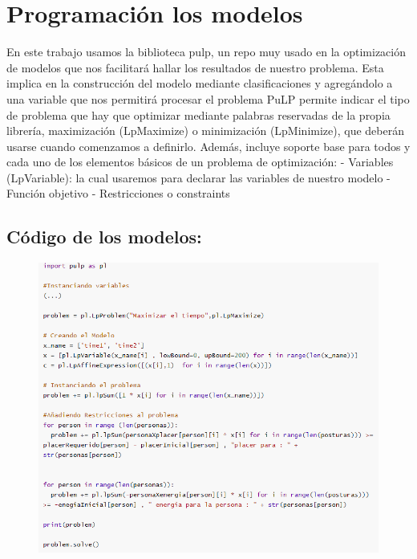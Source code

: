 \documentclass{llncs}
\begin{document}
\newpage

\section{Programación los modelos}	
En este trabajo usamos la biblioteca pulp, un repo muy usado en la optimización de modelos que nos facilitará hallar los resultados de nuestro problema. Esta implica en la construcción del modelo mediante clasificaciones y agregándolo a una variable que nos permitirá procesar el problema
\newline
\newline
PuLP permite indicar el tipo de problema que hay que optimizar mediante palabras reservadas de la propia librería, maximización (LpMaximize) o minimización (LpMinimize), que deberán usarse cuando comenzamos a definirlo. Además, incluye soporte base para todos y cada uno de los elementos básicos de un problema de optimización:
\newline
\newline
- Variables (LpVariable): la cual usaremos para declarar las variables de nuestro modelo
\newline
- Función objetivo
\newline
- Restricciones o constraints
\newpage
\subsection{Código de los modelos:}

\begin{figure}
	\centering
	\includegraphics[width=0.7\linewidth]{Imagenes/modelo1-Guia}
	\label{fig:modelo1-guia}
\end{figure}
\end{document}
